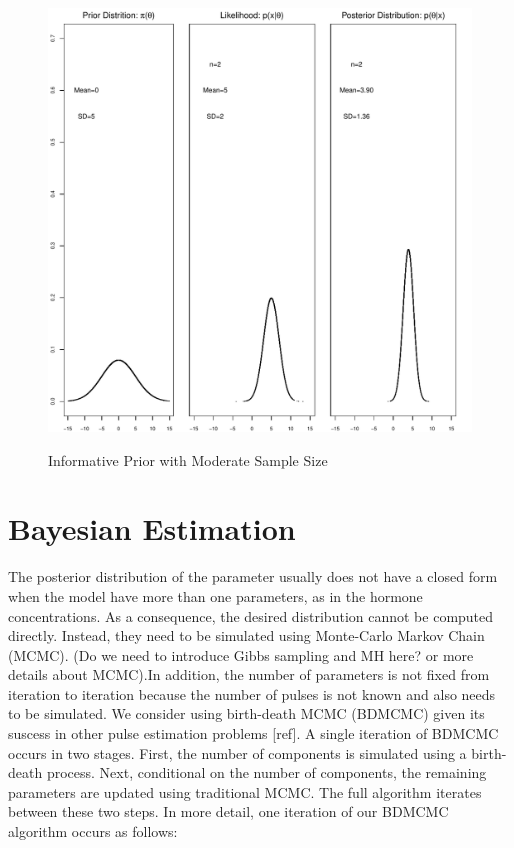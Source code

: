 \documentclass[11pt]{book}
\begin{document}
\begin{figure}
  \centering
  \includegraphics[width=\textwidth]{graph3_smallN.pdf}\\
  \caption{ Informative Prior with Moderate Sample Size}\label{Graph3}
\end{figure}
\section{Bayesian Estimation}

The posterior distribution of the parameter usually does not have a closed form  when the model have more than one parameters, as in the hormone concentrations. As a consequence, the desired distribution cannot be computed directly. Instead, they need to be simulated using Monte-Carlo Markov Chain (MCMC). (Do we need to introduce Gibbs sampling and MH here? or more details about MCMC).In addition, the number of parameters is not fixed from iteration to iteration because the number of pulses is not known and also needs to be simulated. We consider using birth-death MCMC (BDMCMC) given its suscess in other pulse estimation problems [ref]. A single iteration of BDMCMC occurs in two stages. First, the number of components is simulated using a birth-death process. Next, conditional on the number of components, the remaining parameters are updated using traditional MCMC. The full algorithm iterates between these two steps.
In more detail, one iteration of our BDMCMC algorithm occurs as follows:
\end{document}
